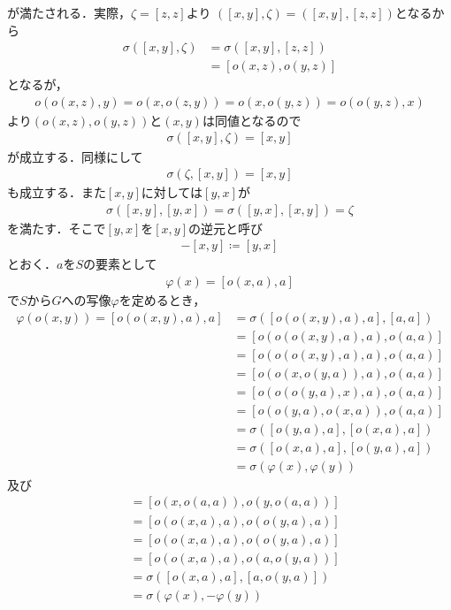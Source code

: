	が満たされる．実際，$\zeta = [z,z]$より
	$\left( [x,y],\zeta \right) = \left( [x,y],[z,z] \right)$となるから
	\begin{align}
		\sigma \left( [x,y],\zeta \right)
		&= \sigma \left( [x,y],[z,z] \right) \\
		&= \left[ o(x,z), o(y,z) \right]
	\end{align}
	となるが，
	\begin{align}
		o(o(x,z),y) = o(x,o(z,y)) = o(x,o(y,z)) = o(o(y,z),x)
	\end{align}
	より$(o(x,z),o(y,z))$と$(x,y)$は同値となるので
	\begin{align}
		\sigma \left( [x,y],\zeta \right) = [x,y]
	\end{align}
	が成立する．同様にして
	\begin{align}
		\sigma \left( \zeta,[x,y] \right) = [x,y]
	\end{align}
	も成立する．また$[x,y]$に対しては$[y,x]$が
	\begin{align}
		\sigma([x,y],[y,x]) = \sigma([y,x],[x,y]) = \zeta
	\end{align}
	を満たす．そこで$[y,x]$を$[x,y]$の逆元と呼び
	\begin{align}
		-[x,y] \coloneqq [y,x]
	\end{align}
	とおく．$a$を$S$の要素として
	\begin{align}
		\varphi(x) = [o(x,a),a]
	\end{align}
	で$S$から$G$への写像$\varphi$を定めるとき，
	\begin{align}
		\varphi(o(x,y)) = [o(o(x,y),a),a]
		&= \sigma \left( [o(o(x,y),a),a],[a,a] \right) \\
		&= [o(o(o(x,y),a),a),o(a,a)] \\
		&= [o(o(o(x,y),a),a),o(a,a)] \\
		&= [o(o(x,o(y,a)),a),o(a,a)] \\
		&= [o(o(o(y,a),x),a),o(a,a)] \\
		&= [o(o(y,a),o(x,a)),o(a,a)] \\
		&= \sigma \left( [o(y,a),a],[o(x,a),a] \right) \\
		&= \sigma \left( [o(x,a),a],[o(y,a),a] \right) \\
		&= \sigma \left( \varphi(x),\varphi(y) \right)
	\end{align}
	及び
	\begin{align}
		[x,y] &= [o(x,o(a,a)),o(y,o(a,a))] \\
		&= [o(o(x,a),a),o(o(y,a),a)] \\
		&= [o(o(x,a),a),o(o(y,a),a)] \\
		&= [o(o(x,a),a),o(a,o(y,a))] \\
		&= \sigma \left( [o(x,a),a],[a,o(y,a)] \right) \\
		&= \sigma \left( \varphi(x),-\varphi(y) \right)
	\end{align}
